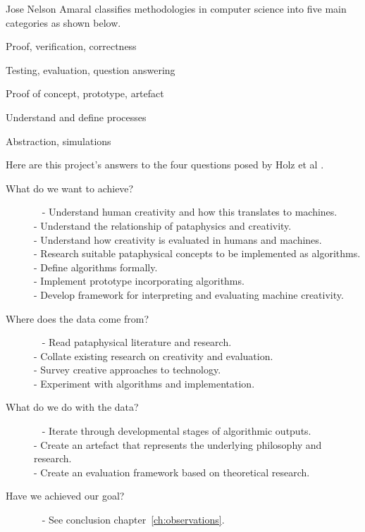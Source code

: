 Jose Nelson Amaral \autocite*{Amaral2006} classifies methodologies in computer science into five main categories as shown below.

\begin{description}[leftmargin=3.5cm]
  \item [Formal] Proof, verification, correctness
  \item [Experimental] Testing, evaluation, question answering
  \item [Build] Proof of concept, prototype, artefact
  \item [Process] Understand and define processes
  \item [Model] Abstraction, simulations
\end{description}

\spirals

Here are this project's answers to the four questions posed by Holz et al \autocite*{Holz2006}.

\begin{description}
  \item[What do we want to achieve?]~
    - Understand human creativity and how this translates to machines.\\
    - Understand the relationship of pataphysics and creativity.\\
    - Understand how creativity is evaluated in humans and machines.\\
    - Research suitable pataphysical concepts to be implemented as algorithms.\\ 
    - Define algorithms formally.\\
    - Implement prototype incorporating algorithms.\\
    - Develop framework for interpreting and evaluating machine creativity.
	\item[Where does the data come from?]~
    - Read pataphysical literature and research.\\
    - Collate existing research on creativity and evaluation.\\
    - Survey creative approaches to technology.\\
    - Experiment with algorithms and implementation.
	\item[What do we do with the data?]~
    - Iterate through developmental stages of algorithmic outputs.\\
    - Create an artefact that represents the underlying philosophy and research.\\
    - Create an evaluation framework based on theoretical research.
  \item[Have we achieved our goal?]~
    - See conclusion chapter~\ref{ch:observations}.
\end{description}

